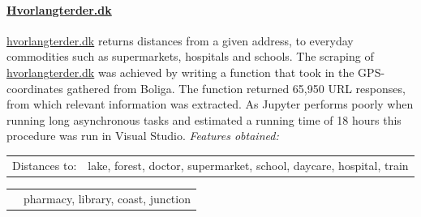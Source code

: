 \documentclass[12pt,a4paper]{article}
\begin{document}
\paragraph{\href{https://www.hvorlangterder.dk}{Hvorlangterder.dk}\newline}
\href{https://www.hvorlangterder.dk}{hvorlangterder.dk} returns distances from a given address, to everyday commodities such as supermarkets, hospitals and schools.   
The scraping of \href{https://www.hvorlangterder.dk}{hvorlangterder.dk} was achieved by writing a function that took in the GPS-coordinates gathered from Boliga. The function returned 65,950 URL responses, from which relevant information was extracted.\newline
As Jupyter performs poorly when running long asynchronous tasks and estimated a running time of 18 hours this procedure was run in Visual Studio.
 \vspace*{10px} \newline
\textit{Features obtained:}\newline
\begin{tabular}{c c}
Distances to: & lake, forest, doctor, supermarket,	school, daycare, hospital, train \\	
\end{tabular}\newline 
\begin{tabular}{c c}
\qquad \qquad \qquad \qquad &  pharmacy, library, coast, junction \\	
\end{tabular}
\end{document}
